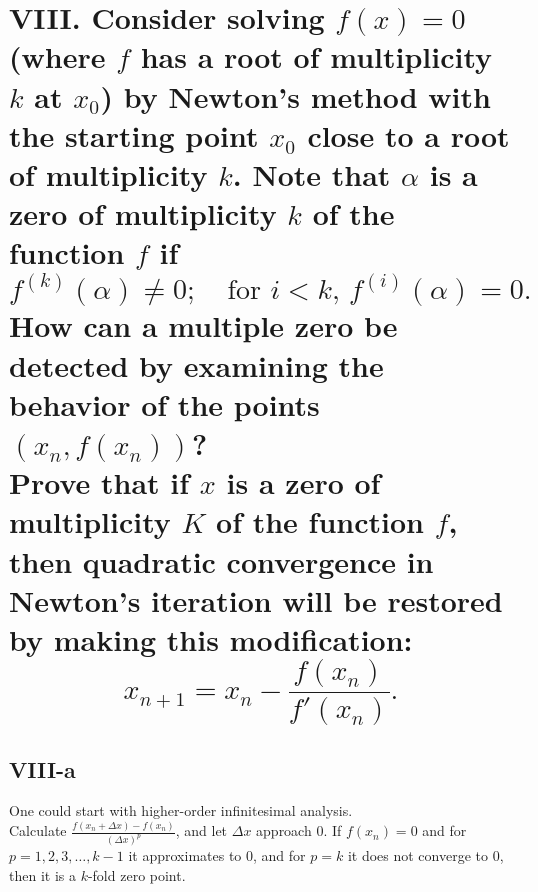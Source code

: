 \documentclass[a4paper]{article}
\begin{document}
\section*{VIII. Consider solving \( f(x) = 0 \) (where \( f \) has a root of multiplicity \( k \) at \( x_0 \)) by Newton's method with the starting point \( x_0 \) close to a root of multiplicity \( k \). Note that \( \alpha \) is a zero of multiplicity \( k \) of the function \( f \) if
\[
f^{(k)}(\alpha) \neq 0; \quad \text{for } i < k, \, f^{(i)}(\alpha) = 0.
\]
How can a multiple zero be detected by examining the behavior of the points \( (x_n, f(x_n)) \)?
\\
Prove that if \( x \) is a zero of multiplicity \( K \) of the function \( f \), then quadratic convergence in Newton's iteration will be restored by making this modification:
\[
x_{n+1} = x_n - \frac{f(x_n)}{f'(x_n)}.
\]
}

\subsection*{VIII-a}
One could start with higher-order infinitesimal analysis.\\
Calculate \( \frac{f(x_n + \Delta x)-f(x_n)}{(\Delta x)^p} \), and let \( \Delta x \) approach 0. If \(f(x_n)=0\) and for \( p = 1, 2, 3, \ldots, k-1 \) it approximates to 0, and for \( p = k \) it does not converge to 0, then it is a \( k \)-fold zero point.\\
\end{document}
